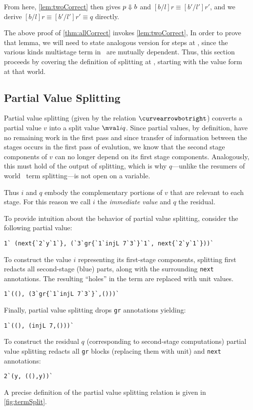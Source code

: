 \begin{abstrsyn}
From here, \ref{lem:twoCorrect} then gives ${p} \Downarrow {b}$ and $[b/l]r \equiv [b'/l']r'$,
and we derive $[b/l]r \equiv [b'/l']r' \equiv q$ directly.

The above proof of \ref{thm:allCorrect} invokes \ref{lem:twoCorrect},
In order to prove that lemma, 
we will need to state analogous version for steps at \bbonem,
since the various kinds multistage term in \lang\ are mutually dependent.
Thus, this section proceeds by covering the definition of splitting at \bbonem, 
starting with the value form at that world.

\subsection{Partial Value Splitting}
\label{sec:masking}

Partial value splitting (given by the relation $\vsplito$) converts a 
partial value $v$ into a split value $\mval i q$.
Since partial values, by definition, have no remaining work in the first pass
and since transfer of information between the stages occurs in the first pass of evalution,
we know that the second stage components of $v$ can no longer depend on its first stage components.
Analogously, this must hold of the output of splitting, 
which is why $q$---unlike the resumers of world \bbtwo\ term splitting---is not open on a variable.

Thus $i$ and $q$ embody the complementary portions of $v$ that are relevant to each stage.
For this reason we call $i$ the \emph{immediate value} and $q$ the residual.

To provide intuition about the behavior of partial value splitting, consider the
following partial value:
\begin{lstlisting}
1` (next{`2`y`1`}, (`3`gr{`1`injL 7`3`}`1`, next{`2`y`1`}))`
\end{lstlisting}
To construct the value $i$ representing its first-stage components,
splitting first redacts all second-stage (blue) parts, along with the
surrounding \texttt{next} annotations. 
The resulting ``holes'' in the term are replaced with
unit values.
\begin{lstlisting}
1`((), (3`gr{`1`injL 7`3`}`,()))`
\end{lstlisting}
Finally, partial value splitting drops \texttt{gr} annotations yielding:
\begin{lstlisting}
1`((), (injL 7,()))`
\end{lstlisting}
To construct the residual $q$ (corresponding to second-stage computations) partial value splitting redacts all \texttt{gr} blocks
(replacing them with unit) and \texttt{next} annotations:
\begin{lstlisting}
2`(y, ((),y))`
\end{lstlisting}
A precise definition of the partial value splitting relation is given in
\ref{fig:termSplit}.


\end{abstrsyn}
